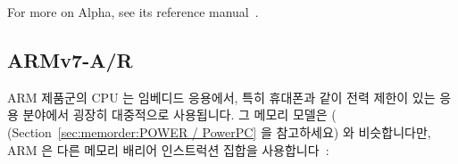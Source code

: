 For more on Alpha, see its reference manual~\cite{ALPHA2002}.
\fi

\subsection{ARMv7-A/R}
\label{sec:memorder:ARMv7-A/R}

ARM 제품군의 CPU 는 임베디드 응용에서, 특히 휴대폰과 같이 전력 제한이 있는 응용
분야에서 굉장히 대중적으로 사용됩니다.
그 메모리 모델은 \Power{}(
(Section~\ref{sec:memorder:POWER / PowerPC} 을 참고하세요) 와 비슷합니다만, ARM
은 다른 메모리 배리어 인스트럭션 집합을 사용합니다~\cite{ARMv7A:2010}:


